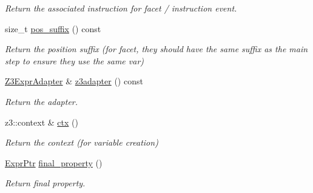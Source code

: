 \begin{DoxyCompactItemize}
\begin{DoxyCompactList}\small\item\em Return the associated instruction for facet / instruction event. \end{DoxyCompactList}\item 
\mbox{\label{classilang_1_1_trace_step_aa5a52e788d8776bc6a51de60646def46}} 
size\+\_\+t \mbox{\hyperlink{classilang_1_1_trace_step_aa5a52e788d8776bc6a51de60646def46}{pos\+\_\+suffix}} () const
\begin{DoxyCompactList}\small\item\em Return the position suffix (for facet, they should have the same suffix as the main step to ensure they use the same var) \end{DoxyCompactList}\item 
\mbox{\label{classilang_1_1_trace_step_a2c5f986fa4a3bd33b4d34b076e894958}} 
\mbox{\hyperlink{classilang_1_1_z3_expr_adapter}{Z3\+Expr\+Adapter}} \& \mbox{\hyperlink{classilang_1_1_trace_step_a2c5f986fa4a3bd33b4d34b076e894958}{z3adapter}} () const
\begin{DoxyCompactList}\small\item\em Return the adapter. \end{DoxyCompactList}\item 
\mbox{\label{classilang_1_1_trace_step_afcab3e7a5ce7b619dd445882a9846c93}} 
z3\+::context \& \mbox{\hyperlink{classilang_1_1_trace_step_afcab3e7a5ce7b619dd445882a9846c93}{ctx}} ()
\begin{DoxyCompactList}\small\item\em Return the context (for variable creation) \end{DoxyCompactList}\item 
\mbox{\label{classilang_1_1_trace_step_a6c8f204468eccaca393969386ca29c18}} 
\mbox{\hyperlink{namespaceilang_a7c4196c72e53ea4df4b7861af7bc3bce}{Expr\+Ptr}} \mbox{\hyperlink{classilang_1_1_trace_step_a6c8f204468eccaca393969386ca29c18}{final\+\_\+property}} ()
\begin{DoxyCompactList}\small\item\em Return final property. \end{DoxyCompactList}\item 
\mbox{\label{classilang_1_1_trace_step_a66648351fc56eb04788815ee04621153}} 

\end{DoxyCompactItemize}
